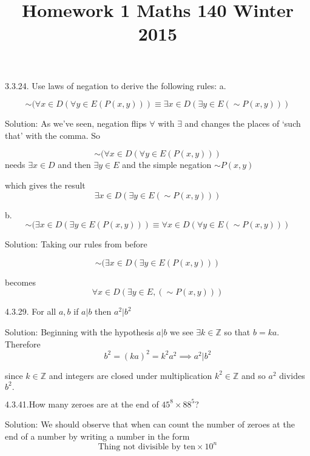 \documentclass[16 pt]{amsart}
\theoremstyle{definition}
\theoremstyle{remark}
\numberwithin{equation}{subsection}
\newcommand{\Z}{\mathbb{Z}}
\begin{document}
\title{Homework 1 Maths 140 Winter 2015}
\maketitle 


3.3.24. Use laws of negation to derive the following rules:
a.

\[
\sim (\forall x \in D ( \forall y \in E (P(x,y))) \equiv \exists x\in D (\exists y\in E( \sim P(x,y)))
\]

\vspace{1in}

Solution: As we've seen, negation flips $\forall$ with $\exists$ and changes the places of `such that' with the comma. So 

\[
\sim (\forall x \in D ( \forall y \in E (P(x,y))) 
\]
needs $\exists x\in D$ and then $\exists y\in E$ and the simple negation $\sim P(x,y)$

which gives the result
\[
\exists x\in D (\exists y\in E( \sim P(x,y)))
\]

\vspace{1in}

b.
\[
\sim (\exists x\in D ( \exists y\in E( P(x,y))) \equiv \forall x\in D(\forall y\in E (\sim P(x,y)))
\]


\vspace{1in}

Solution:  Taking our rules from before

\[
\sim (\exists x\in D ( \exists y\in E( P(x,y))) 
\]

becomes
\[
\forall x\in D (\exists y\in E, (\sim P(x,y)))
\]


\newpage


4.3.29. For all $a,b$ if $a|b$ then $a^2|b^2$

\vspace{1in}

Solution: Beginning with the hypothesis $a|b$ we see $\exists k \in \mathbb{Z}$ so that $b = ka.$
Therefore
\[
b^2 = (ka)^2 = k^2 a^2 \implies a^2 | b^2
\]
 
since $k\in\Z$ and integers are closed under multiplication $k^2\in\Z$ and so $a^2$ divides $b^2.$



\newpage

4.3.41.How many zeroes are at the end of $45^8 \times 88^5$?


\vspace{1in}

Solution: We should observe that when can count the number of zeroes at the end of a number by writing a number in the form
\[
\text{Thing not divisible by ten} \times 10^n
\]
\end{document}
